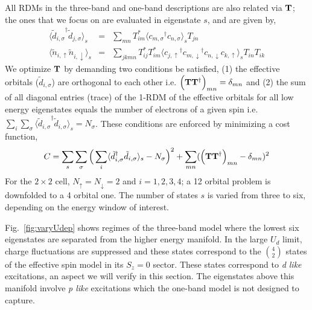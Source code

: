 All RDMs in the three-band and one-band descriptions are also related via ${\bf T}$; 
the ones that we focus on are evaluated in eigenstate $s$, and are given by,
\begin{subequations}
\begin{eqnarray}
	\langle {\tilde{d}_{i,\sigma}}^{\dagger} \tilde{d}_{j,\sigma} \rangle_{s} &=& \sum_{mn} T^{*}_{im} \langle {c_{m,\sigma}}^{\dagger} c_{n,\sigma} \rangle_{s} T_{jn} \label{eq:dmstransformations1} \\
	\langle \tilde{n}_{i,\uparrow} \tilde{n}_{i,\downarrow} \rangle_{s} &=& \sum_{jkmn} T^{*}_{ij} T^{*}_{im} \langle {c_{j,\uparrow}}^{\dagger} {c_{m,\downarrow}}^{\dagger} c_{n,\downarrow} c_{k,\uparrow} \rangle_{s} T_{in} T_{ik}
\label{eq:dmstransformations2}
\end{eqnarray}
\end{subequations}
We optimize ${\bf T}$ by demanding two conditions be satisfied, (1) the effective orbitals ($\tilde{d}_{i,\sigma}$) 
are orthogonal to each other i.e. $\Big({\bf T} {\bf T}^{\dagger}\Big)_{mn} = \delta_{mn}$
and (2) the sum of all diagonal entries (trace) of the 1-RDM of the effective orbitals for all low energy eigenstates 
equals the number of electrons of a given spin i.e. $\sum_{i} \sum_{\sigma} \langle {\tilde{d}_{i,\sigma}}^{\dagger} \tilde{d}_{i,\sigma} \rangle_{s} = N_{\sigma}$. 
These conditions are enforced by minimizing a cost function,
\begin{equation}
C = \sum_{s} \sum_{\sigma} \Big( \sum_{i} \langle \tilde{d}_{i,\sigma}^{\dagger} \tilde{d}_{i,\sigma} \rangle_{s} - N_{\sigma} \Big)^{2} + \sum_{mn} ( \Big({\bf T} {\bf T}^{\dagger}\Big)_{mn} -\delta_{mn})^{2}
\label{eq:C}
\end{equation} 
For the $2\times2$ cell, $N_{\uparrow}=N_{\downarrow}=2$ and $i=1,2,3,4$; a 12 orbital problem 
is downfolded to a 4 orbital one. The number of states $s$ is 
varied from three to six, depending on the energy window of interest.  

Fig.~\ref{fig:varyUdep} shows regimes of the three-band model where 
the lowest six eigenstates are separated from the higher energy manifold. 
In the large $U_d$ limit, charge fluctuations are suppressed and these states 
correspond to the $4 \choose 2$ states of the effective spin model in its $S_z=0$ sector.
These states correspond to \textit{d like} excitations, an aspect we will verify in this section. 
The eigenstates above this manifold involve \textit{p like} excitations which the one-band model is not designed to capture. 

